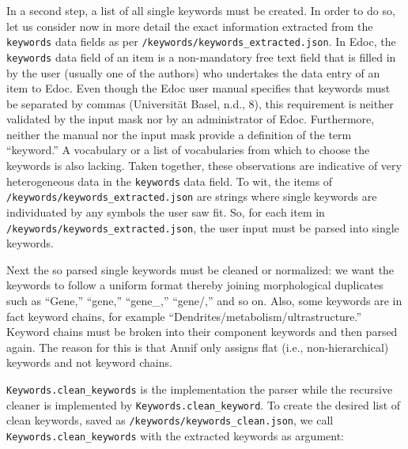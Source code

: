 In a second step, a list of all single keywords must be created. In
order to do so, let us consider now in more detail the exact information
extracted from the \texttt{keywords} data fields as per
\texttt{/keywords/keywords\_extracted.json}. In Edoc, the
\texttt{keywords} data field of an item is a non-mandatory free text
field that is filled in by the user (usually one of the authors) who
undertakes the data entry of an item to Edoc. Even though the Edoc user
manual specifies that keywords must be separated by commas (Universität
Basel, n.d., 8), this requirement is neither validated by the input mask
nor by an administrator of Edoc. Furthermore, neither the manual nor the
input mask provide a definition of the term ``keyword.'' A vocabulary or
a list of vocabularies from which to choose the keywords is also
lacking. Taken together, these observations are indicative of very
heterogeneous data in the \texttt{keywords} data field. To wit, the
items of \texttt{/keywords/keywords\_extracted.json} are strings where
single keywords are individuated by any symbols the user saw fit. So,
for each item in \texttt{/keywords/keywords\_extracted.json}, the user
input must be parsed into single keywords.

Next the so parsed single keywords must be cleaned or normalized: we
want the keywords to follow a uniform format thereby joining
morphological duplicates such as ``Gene,'' ``gene,'' ``gene\_,''
``gene/,'' and so on. Also, some keywords are in fact keyword chains,
for example ``Dendrites/metabolism/ultrastructure.'' Keyword chains must
be broken into their component keywords and then parsed again. The
reason for this is that Annif only assigns flat (i.e., non-hierarchical)
keywords and not keyword chains.

\texttt{Keywords.clean\_keywords} is the implementation the parser while
the recursive cleaner is implemented by
\texttt{Keywords.clean\_keyword}. To create the desired list of clean
keywords, saved as \texttt{/keywords/keywords\_clean.json}, we call
\texttt{Keywords.clean\_keywords} with the extracted keywords as
argument:

\begin{Shaded}
\begin{Highlighting}[]
\OperatorTok{=}\NormalTok{)}
\OperatorTok{=}
\NormalTok{)}
\end{Highlighting}
\end{Shaded}

